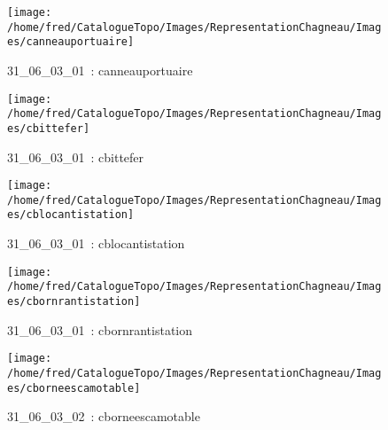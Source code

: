 \documentclass[12pt,titlepage]{book}
\begin{document}
\begin{figure}[h!]
  \hfill         %
  \begin{minipage}[t]{3cm}
    \begin{center}
      \texttt{[image: /home/fred/CatalogueTopo/Images/RepresentationChagneau/Images/canneauportuaire]}
      \caption[~31\_06\_03\_01]{\small{31\_06\_03\_01~:} \tiny{canneauportuaire}}\label{canneauportuaire}
    \end{center}
  \end{minipage}
  \begin{minipage}[t]{3cm}
    \begin{center}
      \texttt{[image: /home/fred/CatalogueTopo/Images/RepresentationChagneau/Images/cbittefer]}
      \caption[~31\_06\_03\_01]{\small{31\_06\_03\_01~:} \tiny{cbittefer}}\label{cbittefer}
    \end{center}
  \end{minipage}
  \begin{minipage}[t]{3cm}
    \begin{center}
      \texttt{[image: /home/fred/CatalogueTopo/Images/RepresentationChagneau/Images/cblocantistation]}
      \caption[~31\_06\_03\_01]{\small{31\_06\_03\_01~:} \tiny{cblocantistation}}\label{cblocantistation}
    \end{center}
  \end{minipage}
  \begin{minipage}[t]{3cm}
    \begin{center}
      \texttt{[image: /home/fred/CatalogueTopo/Images/RepresentationChagneau/Images/cbornrantistation]}
      \caption[~31\_06\_03\_01]{\small{31\_06\_03\_01~:} \tiny{cbornrantistation}}\label{cbornrantistation}
    \end{center}
  \end{minipage}
  \begin{minipage}[t]{3cm}
    \begin{center}
      \texttt{[image: /home/fred/CatalogueTopo/Images/RepresentationChagneau/Images/cborneescamotable]}
      \caption[~31\_06\_03\_02]{\small{31\_06\_03\_02~:} \tiny{cborneescamotable}}\label{cborneescamotable}
    \end{center}
  \end{minipage}

\end{figure}
\end{document}
